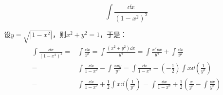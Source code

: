 \begin{example}
\[\int\frac{\dd x}{(1-x^2)^2}\]
\end{example}
\begin{solution}
设$y=\sqrt{|1-x^2|}$，则$x^2+y^2=1$，于是：
\begin{align*}
\int\frac{\dd x}{(1-x^2)^2}=&\int\frac{\dd x}{y^4}=\int\frac{(x^2+y^2)\dd x}{y^4}=\int\frac{x^2\dd x}{y^4}+\int\frac{\dd x}{y^2}\\
=&\int\frac{\dd x}{1-x^2}-\int\frac{x\dd y}{y^3}=\int\frac{\dd x}{1-x^2}-\left(-\frac12\right)\int x\dd\left(\frac1{y^2}\right)\\
=&\int\frac{\dd x}{1-x^2}+\frac12\int x\dd\left(\frac1{y^2}\right)=\int\frac{\dd x}{1-x^2}+\frac12\left(\frac{x}{y^2}-\int\frac{\dd x}{y^2}\right)
\end{align*}
\end{solution}


